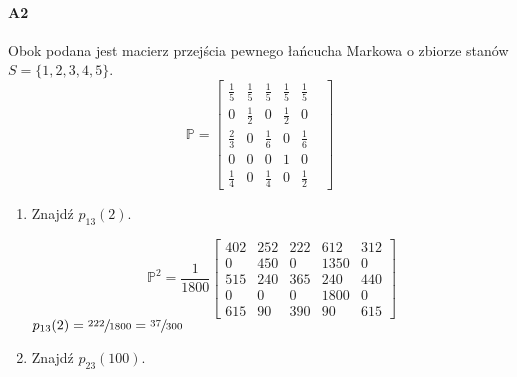 \documentclass[a4paper,12pt]{article}
\theoremstyle{definition}%
\theoremstyle{definition}
\theoremstyle{problem}
\begin{document}
\paragraph{A2} Obok podana jest macierz przejścia pewnego łańcucha Markowa o zbiorze stanów $S = \{1, 2, 3, 4, 5\}$.
$$\mathbb{P}=\begin{bmatrix}
\frac{1}{5}&\frac{1}{5}&\frac{1}{5}&\frac{1}{5}&\frac{1}{5}&\\
0&\frac{1}{2}&0&\frac{1}{2}&0\\
\frac{2}{3}&0&\frac{1}{6}&0&\frac{1}{6}&\\
0&0&0&1&0\\
\frac{1}{4}&0&\frac{1}{4}&0&\frac{1}{2}&
\end{bmatrix}$$
\begin{enumerate}[label=\alph*)]
\item Znajdź $p_{13}(2)$.

$$\mathbb{P}^2= \frac{1}{1800}\begin{bmatrix}
402 & 252 & 222 & 612 & 312\\
0 & 450 & 0 & 1350 & 0\\
515 & 240 & 365 & 240 & 440\\
0 & 0 & 0 & 1800 & 0\\
615 & 90 & 390 & 90 & 615
\end{bmatrix}$$
$p_{13}(2)=\sfrac{222}{1800}=\sfrac{37}{300}$
\item Znajdź $p_{23}(100)$.


\end{enumerate}
\end{document}
